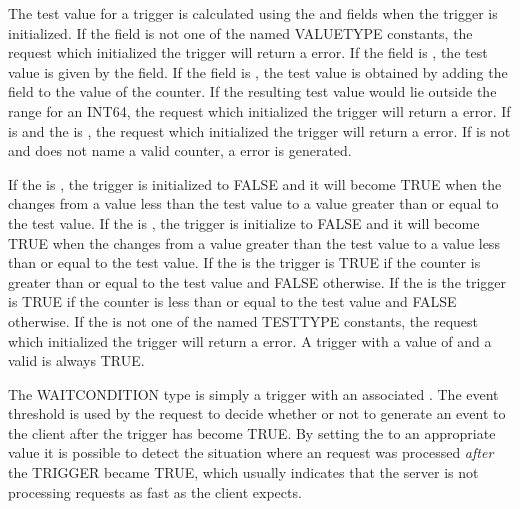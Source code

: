 The test value for a trigger is calculated using the  and
 fields when the trigger is initialized. 
If the  field is not one of the 
named VALUETYPE constants, the request which initialized the trigger
will return a  error. If the
 field is , the test value is given by the
 field. If the  field is
, the test value is obtained by adding the
 field to the value of the counter.  If the
resulting test value would lie outside the range for an INT64, the
request which initialized the trigger will return a
 error. If  is  and the
 is , the request which initialized the 
trigger will return a  error. 
If  is not  and does not name a valid
counter, a  error is generated.

If the  is , the trigger is
initialized to FALSE and it will become TRUE when the  changes
from a value less than the test value to a value greater than or equal to the
test value. If the  is , the
trigger is initialize to FALSE and it will become TRUE when the
 changes from a value greater than the test value to a value
less than or equal to the test value. If the  is
 the trigger is TRUE if the counter is greater than or
equal to the test value and FALSE otherwise.  If the  is
 the trigger is TRUE if the counter is less than or
equal to the test value and FALSE otherwise. If the 
is not one of the named TESTTYPE constants, the request which
initialized the trigger will return a  error.  A trigger
with a  value of  and a valid 
is always TRUE.

The WAITCONDITION type is simply a trigger with an associated
.  The event threshold is used by the 
request to decide whether or not to generate an event to the client after the
trigger has become TRUE. By setting the  to an
appropriate value it is possible to detect the situation where an
 request was processed {\it after} the TRIGGER became TRUE,
which usually indicates that the server is not processing requests as fast as
the client expects.

